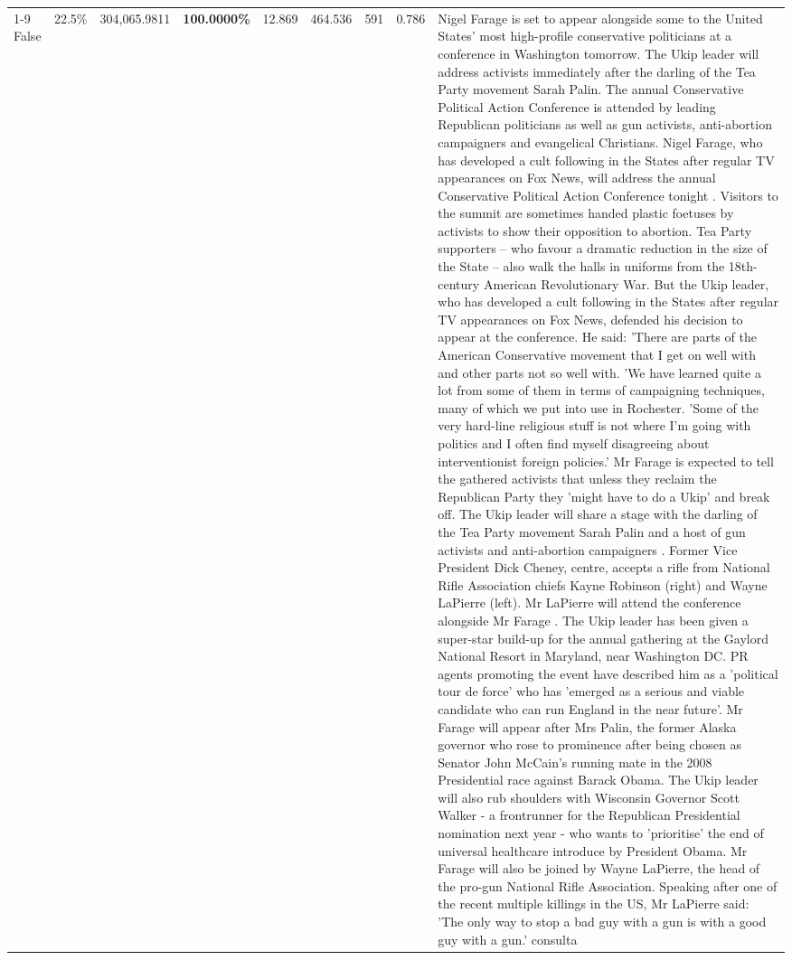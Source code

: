 \begin{table}[H]
\begin{tabular}{lllrlllll}
\cline{1-9}
False & 22.5\% & 304,065.9811 & \bfseries \color{red} 100.0000\% & 12.869 & 464.536 & 591 & 0.786 & Nigel Farage is set to appear alongside some to the United States' most high-profile conservative politicians at a conference in Washington tomorrow. The Ukip leader will address activists immediately after the darling of the Tea Party movement Sarah Palin. The annual Conservative Political Action Conference is attended by leading Republican politicians as well as gun activists, anti-abortion campaigners and evangelical Christians. Nigel Farage, who has developed a cult following in the States after regular TV appearances on Fox News, will address the annual Conservative Political Action Conference tonight . Visitors to the summit are sometimes handed plastic foetuses by activists to show their opposition to abortion. Tea Party supporters – who favour a dramatic reduction in the size of the State – also walk the halls in uniforms from the 18th-century American Revolutionary War. But the Ukip leader, who has developed a cult following in the States after regular TV appearances on Fox News, defended his decision to appear at the conference. He said: 'There are parts of the American Conservative movement that I get on well with and other parts not so well with. 'We have learned quite a lot from some of them in terms of campaigning techniques, many of which we put into use in Rochester. 'Some of the very hard-line religious stuff is not where I'm going with politics and I often find myself disagreeing about interventionist foreign policies.' Mr Farage is expected to tell the gathered activists that unless they reclaim the Republican Party they 'might have to do a Ukip' and break off. The Ukip leader will share a stage with the darling of the Tea Party movement Sarah Palin and a host of gun activists and anti-abortion campaigners . Former Vice President Dick Cheney, centre, accepts a rifle from National Rifle Association chiefs Kayne Robinson (right) and Wayne LaPierre (left). Mr LaPierre will attend the conference alongside Mr Farage . The Ukip leader has been given a super-star build-up for the annual gathering at the Gaylord National Resort in Maryland, near Washington DC. PR agents promoting the event have described him as a 'political tour de force' who has 'emerged as a serious and viable candidate who can run England in the near future'. Mr Farage will appear after Mrs Palin, the former Alaska governor who rose to prominence after being chosen as Senator John McCain's running mate in the 2008 Presidential race against Barack Obama. The Ukip leader will also rub shoulders with Wisconsin Governor Scott Walker - a frontrunner for the Republican Presidential nomination next year - who wants to 'prioritise' the end of universal healthcare introduce by President Obama. Mr Farage will also be joined by Wayne LaPierre, the head of the pro-gun National Rifle Association. Speaking after one of the recent multiple killings in the US, Mr LaPierre said: 'The only way to stop a bad guy with a gun is with a good guy with a gun.' consulta \\

\end{tabular}
\end{table}
